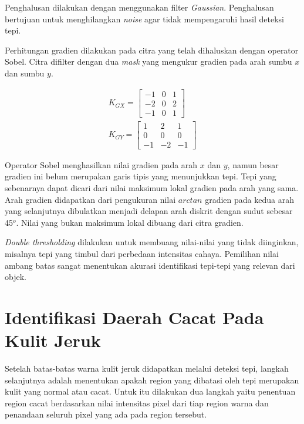 \documentclass[laporan.tex]{subfiles}
\begin{document}
Penghalusan dilakukan dengan menggunakan filter \emph{Gaussian}. Penghalusan bertujuan untuk menghilangkan \emph{noise} agar tidak mempengaruhi hasil deteksi tepi.

Perhitungan gradien dilakukan pada citra yang telah dihaluskan dengan operator Sobel. Citra difilter dengan dua \emph{mask} yang mengukur gradien pada arah sumbu $x$ dan sumbu $y$.

\begin{equation}
\begin{split}
K_{GX} = \begin{bmatrix}
-1 & 0 & 1 \\
-2 & 0 & 2 \\
-1 & 0 & 1
\end{bmatrix}
\\
K_{GY} = \begin{bmatrix}
1 & 2 & 1 \\
0 & 0 & 0 \\
-1 & -2 & -1
\end{bmatrix}
\end{split}
\end{equation}

Operator Sobel menghasilkan nilai gradien pada arah $x$ dan $y$, namun besar gradien ini belum merupakan garis tipis yang menunjukkan tepi. Tepi yang sebenarnya dapat dicari dari nilai maksimum lokal gradien pada arah yang sama. Arah gradien didapatkan dari pengukuran nilai $arctan$ gradien pada kedua arah yang selanjutnya dibulatkan menjadi delapan arah diskrit dengan sudut sebesar 45$^o$. Nilai yang bukan maksimum lokal dibuang dari citra gradien.

\emph{Double thresholding} dilakukan untuk membuang nilai-nilai yang tidak diinginkan, misalnya tepi yang timbul dari perbedaan intensitas cahaya. Pemilihan nilai ambang batas sangat menentukan akurasi identifikasi tepi-tepi yang relevan dari objek.

\section{Identifikasi Daerah Cacat Pada Kulit Jeruk}

Setelah batas-batas warna kulit jeruk didapatkan melalui deteksi tepi, langkah selanjutnya adalah menentukan apakah region yang dibatasi oleh tepi merupakan kulit yang normal atau cacat. Untuk itu dilakukan dua langkah yaitu penentuan region cacat berdasarkan nilai intensitas pixel dari tiap region warna dan penandaan seluruh pixel yang ada pada region tersebut.
\end{document}
